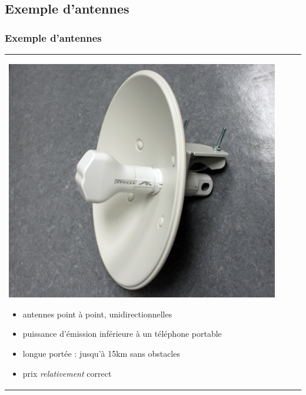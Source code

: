 \documentclass[handout]{beamer}
\begin{document}
	\subsection{Exemple d'antennes}
		\begin{frame}
		\frametitle{Exemple d'antennes}
		\begin{tabular}{l l}
			\begin{minipage}{0.4\textwidth}
				\begin{center}
					\includegraphics[width=0.95\textwidth]{images/nanobridge.jpg}
				\end{center}
			\end{minipage}

			\begin{minipage}{0.6\textwidth}
				\begin{itemize}
					\item antennes point à point, unidirectionnelles
					\item puissance d'émission inférieure à un téléphone portable
					\item longue portée : jusqu'à 15km sans obstacles
					\item prix \textit{relativement} correct
				\end{itemize}
			\end{minipage}
			
		\end{tabular}
		\end{frame}
\end{document}
